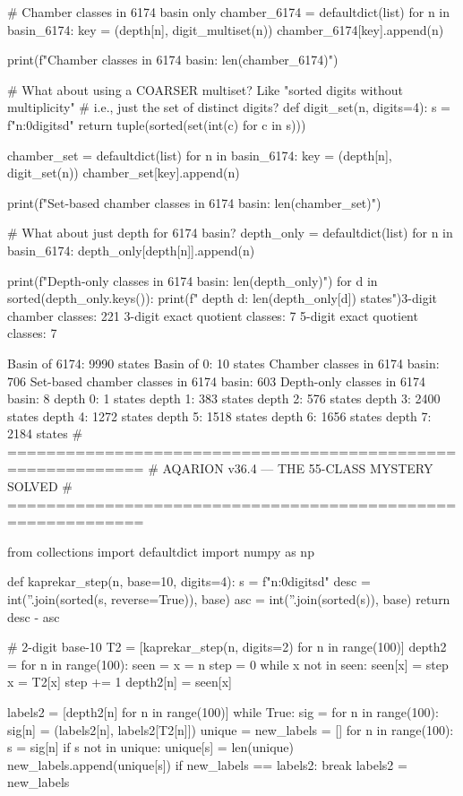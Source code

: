 {{{{{{{{{{{{{# Chamber classes in 6174 basin only
chamber_6174 = defaultdict(list)
for n in basin_6174:
    key = (depth[n], digit_multiset(n))
    chamber_6174[key].append(n)

print(f"Chamber classes in 6174 basin: {len(chamber_6174)}")

# What about using a COARSER multiset? Like "sorted digits without multiplicity"
# i.e., just the set of distinct digits?
def digit_set(n, digits=4):
    s = f"{n:0{digits}d}"
    return tuple(sorted(set(int(c) for c in s)))

chamber_set = defaultdict(list)
for n in basin_6174:
    key = (depth[n], digit_set(n))
    chamber_set[key].append(n)

print(f"Set-based chamber classes in 6174 basin: {len(chamber_set)}")

# What about just depth for 6174 basin?
depth_only = defaultdict(list)
for n in basin_6174:
    depth_only[depth[n]].append(n)

print(f"Depth-only classes in 6174 basin: {len(depth_only)}")
for d in sorted(depth_only.keys()):
    print(f"  depth {d}: {len(depth_only[d])} states")3-digit chamber classes: 221
3-digit exact quotient classes: 7
5-digit exact quotient classes: 7

Basin of 6174: 9990 states
Basin of 0: 10 states
Chamber classes in 6174 basin: 706
Set-based chamber classes in 6174 basin: 603
Depth-only classes in 6174 basin: 8
  depth 0: 1 states
  depth 1: 383 states
  depth 2: 576 states
  depth 3: 2400 states
  depth 4: 1272 states
  depth 5: 1518 states
  depth 6: 1656 states
  depth 7: 2184 states
# ============================================================
# AQARION v36.4 — THE 55-CLASS MYSTERY SOLVED
# ============================================================

from collections import defaultdict
import numpy as np

def kaprekar_step(n, base=10, digits=4):
    s = f"{n:0{digits}d}"
    desc = int(''.join(sorted(s, reverse=True)), base)
    asc = int(''.join(sorted(s)), base)
    return desc - asc

# 2-digit base-10
T2 = [kaprekar_step(n, digits=2) for n in range(100)]
depth2 = {}
for n in range(100):
    seen = {}
    x = n
    step = 0
    while x not in seen:
        seen[x] = step
        x = T2[x]
        step += 1
    depth2[n] = seen[x]

labels2 = [depth2[n] for n in range(100)]
while True:
    sig = {}
    for n in range(100):
        sig[n] = (labels2[n], labels2[T2[n]])
    unique = {}
    new_labels = []
    for n in range(100):
        s = sig[n]
        if s not in unique:
            unique[s] = len(unique)
        new_labels.append(unique[s])
    if new_labels == labels2:
        break
    labels2 = new_labels

}}}}}}}}}}}}}

